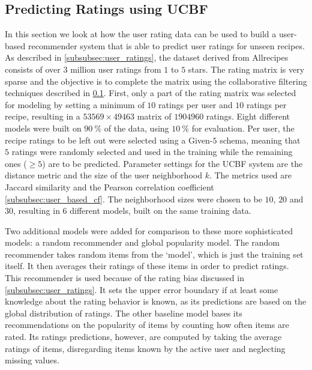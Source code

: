 \subsection{Predicting Ratings using UCBF}
\label{subsec:collaborative_filtering}

In this section we look at how the user rating data can be used to build a user-based recommender system that is able to predict user ratings for unseen recipes.
As described in \cref{subsubsec:user_ratings}, the dataset derived from Allrecipes consists of over $3$ million user ratings from $1$ to $5$ stars.
The rating matrix is very sparse and the objective is to complete the matrix using the collaborative filtering techniques described in \cref{subsec:collaborative_filtering}.
First, only a part of the rating matrix was selected for modeling by setting a minimum of $10$ ratings per user and $10$ ratings per recipe, resulting in a $\num{53569} \times \num{49463}$ matrix of $\num{1904960}$ ratings.
Eight different models were built on $\SI{90}{\percent}$ of the data, using $\SI{10}{\percent}$ for evaluation.
Per user, the recipe ratings to be left out were selected using a Given-$5$ schema, meaning that $5$ ratings were randomly selected and used in the training while the remaining ones ($\geq 5$) are to be predicted.
Parameter settings for the UCBF system are the distance metric and the size of the user neighborhood $k$.
The metrics used are Jaccard similarity and the Pearson correlation coefficient \cref{subsubsec:user_based_cf}.
The neighborhood sizes were chosen to be $10$, $20$ and $30$, resulting in $6$ different models, built on the same training data.

Two additional models were added for comparison to these more sophisticated models: a random recommender and global popularity model.
The random recommender takes random items from the `model', which is just the training set itself.
It then averages their ratings of these items in order to predict ratings.
This recommender is used because of the rating bias discussed in \cref{subsubsec:user_ratings}.
It sets the upper error boundary if at least some knowledge about the rating behavior is known, as its predictions are based on the global distribution of ratings.
The other baseline model bases its recommendations on the popularity of items by counting how often items are rated.
Its ratings predictions, however, are computed by taking the average ratings of items, disregarding items known by the active user and neglecting missing values.
